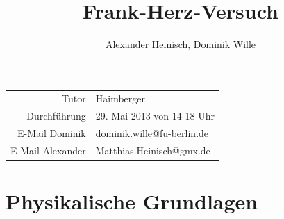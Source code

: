 \documentclass{article}
\title{Frank-Herz-Versuch}
\author{Alexander Heinisch, Dominik Wille}
\begin{document}
\maketitle

{\begin{center}
\begin{minipage}{\linewidth}
\centering
{}
\label{wtd}
\end{minipage}
\end{center}

\vspace{7cm}
\noindent
\begin{center}
\begin{tabular}{r l}
Tutor & Haimberger\\
Durchführung & 29. Mai 2013 von 14-18 Uhr \\

E-Mail Dominik & dominik.wille@fu-berlin.de \\
E-Mail Alexander & Matthias.Heinisch@gmx.de \\
\end{tabular}
\end{center}

\newpage
\tableofcontents
\newpage

\section{Physikalische Grundlagen}
}
\end{document}
